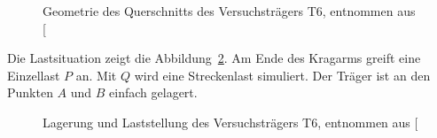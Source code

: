 \documentclass[
  11pt,
  letterpaper,
]{scrreprt}
\begin{document}
\begin{figure}[H]


\caption{\label{fig-geometrie_qs_t6}Geometrie des Querschnitts des
Versuchsträgers T6, entnommen aus
{[}\citeproc{ref-sigrist_versuche_1993}{5}{]}}

\end{figure}%

Die Lastsituation zeigt die Abbildung~\ref{fig-last_t6}. Am Ende des
Kragarms greift eine Einzellast \(P\) an. Mit \(Q\) wird eine
Streckenlast simuliert. Der Träger ist an den Punkten \(A\) und \(B\)
einfach gelagert.

\begin{figure}[H]


\caption{\label{fig-last_t6}Lagerung und Laststellung des
Versuchsträgers T6, entnommen aus
{[}\citeproc{ref-sigrist_versuche_1993}{5}{]}}

\end{figure}%
\end{document}
